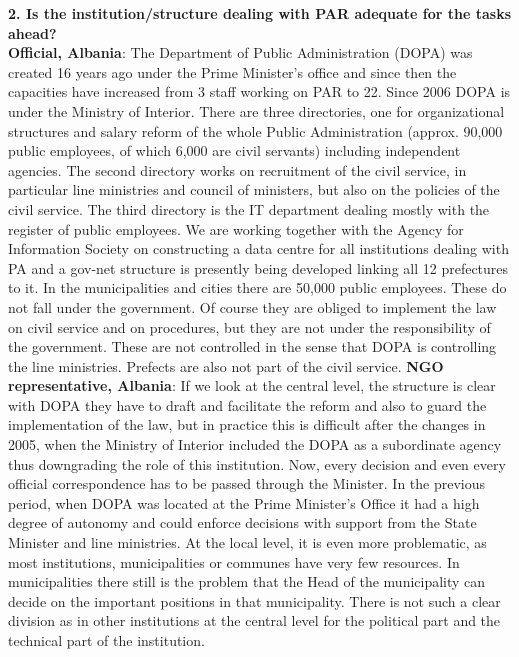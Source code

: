 \textbf{2. Is the institution/structure dealing with PAR adequate for the tasks ahead? }\\
\textbf{Official, Albania}: The Department of Public Administration (DOPA) was created 16 years ago under the Prime Minister’s office and since then the capacities have increased from 3 staff working on PAR to 22. Since 2006 DOPA is under the Ministry of Interior. There are three directories, one for organizational structures and salary reform of the whole Public Administration (approx. 90,000 public employees, of which 6,000 are civil servants) including independent agencies. The second directory works on recruitment of the civil service, in particular line ministries and council of ministers, but also on the policies of the civil service. The third directory is the IT department dealing mostly with the register of public employees. We are working together with the Agency for Information Society on constructing a data centre for all institutions dealing with PA and a gov-net structure is presently being developed linking all 12 prefectures to it. In the municipalities and cities there are 50,000 public employees. These do not fall under the government. Of course they are obliged to implement the law on civil service and on procedures, but they are not under the responsibility of the government. These are not controlled in the sense that DOPA is controlling the line ministries. Prefects are also not part of the civil service.
\textbf{NGO representative, Albania}: If we look at the central level, the structure is clear with DOPA they have to draft and facilitate the reform and also to guard the implementation of the law, but in practice this is difficult after the changes in 2005, when the Ministry of Interior included the DOPA as a subordinate agency thus downgrading the role of this institution. Now, every decision and even every official correspondence has to be passed through the Minister. In the previous period, when DOPA was located at the Prime Minister’s Office it had a high degree of autonomy and could enforce decisions with support from the State Minister and line ministries. At the local level, it is even more problematic, as most institutions, municipalities or communes have very few resources. In municipalities there still is the problem that the Head of the municipality can decide on the important positions in that municipality. There is not such a clear division as in other institutions at the central level for the political part and the technical part of the institution. 
